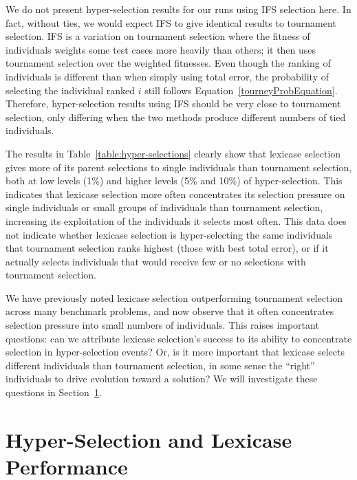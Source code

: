 \documentclass{sig-alternate-05-2015}
\begin{document}
We do not present hyper-selection results for our runs using IFS selection here. In fact, without ties, we would expect IFS to give identical results to tournament selection. IFS is a variation on tournament selection where the fitness of individuals weights some test cases more heavily than others; it then uses tournament selection over the weighted fitnesses. Even though the ranking of individuals is different than when simply using total error, the probability of selecting the individual ranked $i$ still follows Equation~\ref{tourneyProbEquation}. Therefore, hyper-selection results using IFS should be very close to tournament selection, only differing when the two methods produce different numbers of tied individuals.

The results in Table~\ref{table:hyper-selections} clearly show that lexicase selection gives more of its parent selections to single individuals than tournament selection, both at low levels (1\%) and higher levels (5\% and 10\%) of hyper-selection. This indicates that lexicase selection more often concentrates its selection pressure on single individuals or small groups of individuals than tournament selection, increasing its exploitation of the individuals it selects most often. This data does not indicate whether lexicase selection is hyper-selecting the same individuals that tournament selection ranks highest (those with best total error), or if it actually selects individuals that would receive few or no selections with tournament selection.

We have previously noted lexicase selection outperforming tournament selection across many benchmark problems, and now observe that it often concentrates selection pressure into small numbers of individuals. This raises important questions: can we attribute lexicase selection's success to its ability to concentrate selection in hyper-selection events? Or, is it more important that lexicase selects different individuals than tournament selection, in some sense the ``right'' individuals to drive evolution toward a solution? We will investigate these questions in Section~\ref{section:HyperSelectionandLexicasePerformance}.

\section{Hyper-Selection and Lexicase Performance}
\label{section:HyperSelectionandLexicasePerformance}
\end{document}
